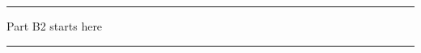 \documentclass[11pt]{article}
\begin{document}



\clearpage
\hrule
\smallskip
{\centering \small Part B2 starts here

}







\clearpage
\hrule


 

\end{document}
